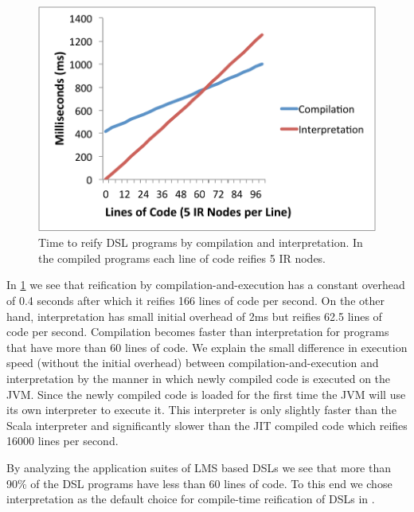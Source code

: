 \begin{figure}[!ht]
\centering
\includegraphics[scale=0.75]{diagrams/interpretation-vs-compilation.pdf}
\caption{Time to reify DSL programs by compilation and interpretation. In the compiled programs each line
 of code reifies 5 IR nodes.}
\label{fig:interpretation-vs-compilation}
\end{figure}


In \ref{fig:interpretation-vs-compilation} we see that reification by
 compilation-and-execution has a constant overhead of 0.4 seconds after which it reifies 166 lines of code per second. On the other hand, interpretation has small initial overhead of 2ms but reifies 62.5 lines of code per second.
 Compilation becomes faster than interpretation for programs that have more than 60 lines of code.
 We explain the small difference in execution speed (without the initial overhead) between compilation-and-execution and interpretation by the manner in which newly compiled code is executed on the JVM. Since the newly compiled code is loaded for the first time
 the JVM will use its own interpreter to execute it. This interpreter is only slightly faster than
 the Scala interpreter and significantly slower than the JIT compiled code which reifies 16000 lines per second.

By analyzing the application suites of LMS based DSLs we see that more than 90\% of the
 DSL programs have less than 60 lines of code. To this end we chose interpretation as the default
 choice for compile-time reification of DSLs in \yy.













